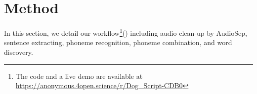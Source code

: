 \section{Method}
\label{sec:method}

In this section, we detail our workflow\footnote{The code and a live demo are available at \url{https://anonymous.4open.science/r/Dog_Script-CDB0}}() including audio clean-up by AudioSep, sentence extracting, phoneme recognition, phoneme combination, and word discovery. 

\begin{figure}[th]
    \centering

\end{figure}
